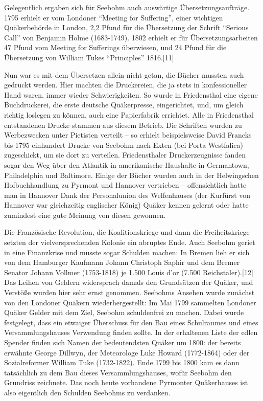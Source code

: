 \medskip

Gelegentlich ergaben sich für Seebohm auch auswärtige Übersetzungsaufträge. 1795
erhielt er vom Londoner "`Meeting for Suffering"', einer wichtigen Quäkerbehörde
in London, 2,2 Pfund für die Übersetzung der Schrift "`Serious Call"' von
Benjamin Holme (1683-1749). 1802 erhielt er für Übersetzungsarbeiten 47 Pfund
vom Meeting for Sufferings überwiesen, und 24 Pfund für die Übersetzung von
William Tukes "`Principles"' 1816.[11]

\medskip

Nun war es mit dem Übersetzen allein nicht getan, die Bücher mussten auch
gedruckt werden. Hier machten die Druckereien, die ja stets in konfessioneller
Hand waren, immer wieder Schwierigkeiten. So wurde in Friedensthal eine eigene
Buchdruckerei, die erste deutsche Quäkerpresse, eingerichtet, und, um gleich
richtig loslegen zu können, auch eine Papierfabrik errichtet. Alle in
Friedensthal entstandenen Drucke stammen aus diesem Betrieb. Die Schriften
wurden zu Werbezwecken unter Pietisten verteilt – so erhielt beispielsweise
David Francks bis 1795 einhundert Drucke von Seebohm nach Exten (bei Porta
Westfalica) zugeschickt, um sie dort zu verteilen. Friedensthaler
Druckerzeugnisse fanden sogar den Weg über den Atlantik in amerikanische
Haushalte in Germantown, Philadelphia und Baltimore. Einige der Bücher wurden
auch in der Helwingschen Hofbuchhandlung zu Pyrmont und Hannover vertrieben –
offensichtlich hatte man in Hannover Dank der Personalunion des Welfenhauses
(der Kurfürst von Hannover war gleichzeitig englischer König) Quäker kennen
gelernt oder hatte zumindest eine gute Meinung von diesen gewonnen.

\medskip

Die Französische Revolution, die Koalitionskriege und dann die Freiheitskriege
setzten der vielversprechenden Kolonie ein abruptes Ende. Auch Seebohm geriet in
eine Finanzkrise und musste sogar Schulden machen: In Bremen lieh er sich von
dem Hamburger Kaufmann Johann Christoph Saphir und dem Bremer Senator Johann
Vollmer (1753-1818) je 1.500 Louis d’or (7.500 Reichstaler).[12] Das Leihen von
Geldern widersprach damals den Grundsätzen der Quäker, und Verstöße wurden hier
sehr ernst genommen. Seebohms Ansehen wurde zunächst von den Londoner Quäkern
wiederhergestellt: Im Mai 1799 sammelten Londoner Quäker Gelder mit dem Ziel,
Seebohm schuldenfrei zu machen. Dabei wurde festgelegt, dass ein etwaiger
Überschuss für den Bau eines Schulraumes und eines Versammlungshauses Verwendung
finden sollte. In der erhaltenen Liste der edlen Spender finden sich Namen der
bedeutendsten Quäker um 1800: der bereits erwähnte George Dillwyn, der
Meteorologe Luke Howard (1772-1864) oder der Sozialreformer William Tuke
(1732-1822). Ende 1799 bis 1800 kam es dann tatsächlich zu dem Bau dieses
Versammlungshauses, wofür Seebohm den Grundriss zeichnete. Das noch heute
vorhandene Pyrmonter Quäkerhauses ist also eigentlich den Schulden Seebohms zu
verdanken.

